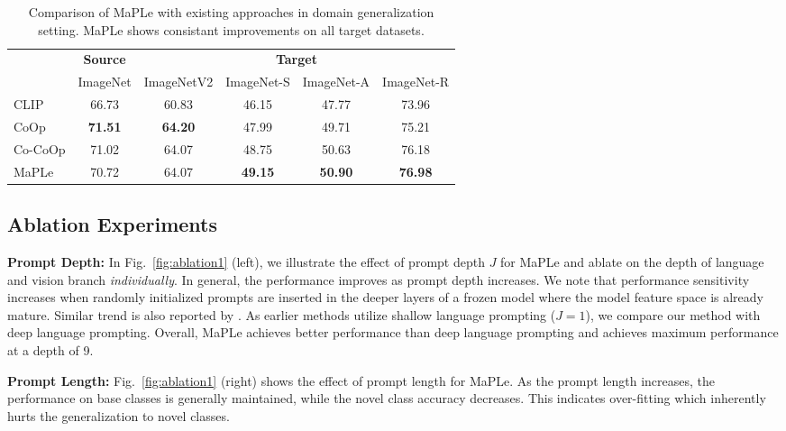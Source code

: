 \documentclass[10pt,twocolumn,letterpaper]{article}
\newcommand{\tablestyle}[2]{\setlength{\tabcolsep}{#1}\renewcommand{\arraystretch}{#2}\centering\footnotesize}
\begin{document}
\begin{table}[!t]
    \centering
\tablestyle{6pt}{1.1}
\addtolength{\tabcolsep}{-4.5pt}
    \begin{tabular}{l ccccc}
    \toprule
    & \textbf{Source} & \multicolumn{4}{c}{\textbf{Target}} \\ \cmidrule(lr){2-2} \cmidrule(lr){3-6}
     & ImageNet & ImageNetV2 & ImageNet-S & ImageNet-A & ImageNet-R \\
    \midrule
    CLIP &  66.73 & 60.83 & {46.15} & 47.77 & {73.96} \\
    CoOp &  \textbf{71.51} & \textbf{64.20} & 47.99  & 49.71  & 75.21  \\
    Co-CoOp & 71.02 & {64.07} & 48.75 & 50.63 & 76.18  \\
    \midrule
    \rowcolor{tabhighlight} MaPLe & 70.72 & {64.07} & \textbf{49.15} & \textbf{50.90}  & \textbf{76.98} \\
    \bottomrule
    \end{tabular}
        \caption{ Comparison of MaPLe with existing approaches in domain generalization setting. MaPLe shows consistant improvements on all target datasets.
    }
    \label{tab:robustness}
\end{table}

\subsection{Ablation Experiments}
\noindent \textbf{Prompt Depth:} 
\noindent In Fig.~\ref{fig:ablation1} (left), we illustrate the effect of prompt depth $J$ for MaPLe and ablate on the depth of language and vision branch \emph{individually}. In general, the performance improves as prompt depth increases. We note that performance sensitivity increases when randomly initialized prompts are inserted in the deeper layers of a frozen model where the model feature space is already mature. Similar trend is also reported by \cite{jia2022visual}. As earlier methods utilize shallow language prompting ($J=1$), we compare our method with deep language prompting. Overall, MaPLe achieves better performance than deep language prompting and achieves maximum performance at a depth of 9. 

\noindent\textbf{Prompt Length:} 
Fig.~\ref{fig:ablation1} (right) shows the effect of prompt length for MaPLe. As the prompt length increases, the performance on base classes is generally maintained, while the novel class accuracy decreases. This indicates over-fitting which inherently hurts the generalization to novel classes.
\end{document}
